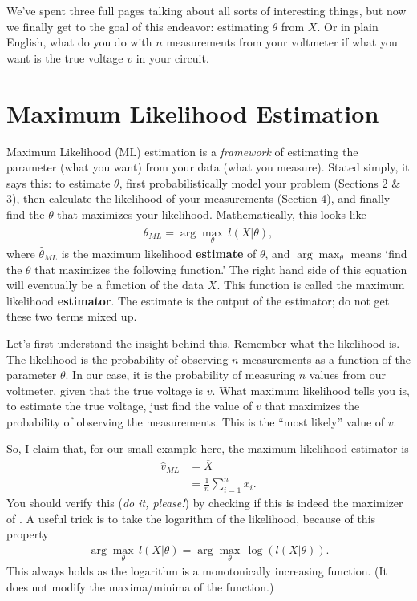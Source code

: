 \documentclass[10pt,letterpaper]{article}
\begin{document}
We've spent three full pages talking about all sorts of interesting things, but now we finally get to the goal of this endeavor: estimating $\theta$ from $X$. Or in plain English, what do you do with $n$ measurements from your voltmeter if what you want is the true voltage $v$ in your circuit.

\section{Maximum Likelihood Estimation}
Maximum Likelihood (ML) estimation is a \emph{framework} of estimating the parameter (what you want) from your data (what you measure). Stated simply, it says this: to estimate $\theta$, first probabilistically model your problem (Sections 2 \& 3), then calculate the likelihood of your measurements (Section 4), and finally find the $\theta$ that maximizes your likelihood. Mathematically, this looks like
\begin{align}
 	\widehat{\theta}_{ML} = \arg \max_\theta\, l(X\vert\theta),
 \end{align} 
where $\widehat{\theta}_{ML}$ is the maximum likelihood \textbf{estimate} of $\theta$, and $ \arg \max_\theta$ means `find the $\theta$ that maximizes the following function.' The right hand side of this equation will eventually be a function of the data $X$. This function is called the maximum likelihood \textbf{estimator}. The estimate is the output of the estimator; do not get these two terms mixed up.

Let's first understand the insight behind this. Remember what the likelihood is. The likelihood is the probability of observing $n$ measurements as a function of the parameter $\theta$. In our case, it is the probability of measuring $n$ values from our voltmeter, given that the true voltage is $v$. What maximum likelihood tells you is, to estimate the true voltage, just find the value of $v$ that maximizes the probability of observing the measurements. This is the ``most likely'' value of $v$.

So, I claim that, for our small example here, the maximum likelihood estimator is
\begin{align}
	\widehat{v}_{ML} &= \overline{X}\\
					 &= \frac{1}{n}\sum_{i=1}^n x_i.
\end{align}
You should verify this (\emph{do it, please!}) by checking if this is indeed the maximizer of . A useful trick is to take the logarithm of the likelihood, because of this property
\begin{align}
	\arg \max_\theta\, l(X\vert\theta) = \arg \max_\theta\, \log\left(l(X\vert\theta)\right).
\end{align}
This always holds as the logarithm is a monotonically increasing function. (It does not modify the maxima/minima of the function.)
\end{document}
